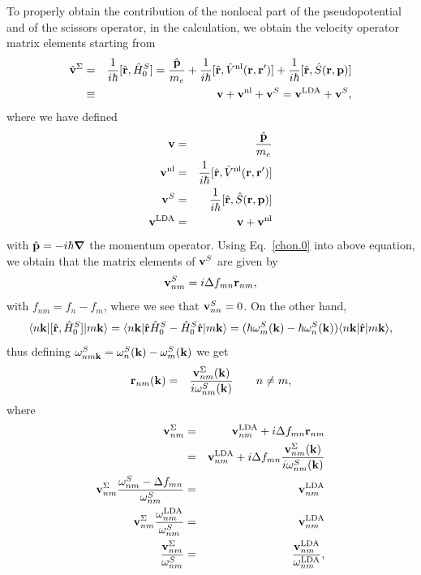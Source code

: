 \documentclass[floatfix,prb,aps,superscriptaddress,11pt,preprint]{revtex4}
\begin{document}
To properly obtain the contribution of the nonlocal part of the
pseudopotential and of the scissors operator, 
in the calculation, we obtain
the velocity operator matrix elements starting from
\begin{eqnarray}\label{vop}
\hat{\mathbf{v}}^\Sigma&=&
\frac{1}{i\hbar}[\hat{\mathbf{r}},\hat{H}^S_0]
=\frac{\hat{\mathbf{p}}}{m_e}
+
\frac{1}{i\hbar}[\hat{\mathbf{r}},\hat V^{\mathrm{nl}}(\mathbf{r},\mathbf{r}')]
+
\frac{1}{i\hbar}[\hat{\mathbf{r}},\hat S(\mathbf{r},\mathbf{p})]
\nonumber\\
&\equiv&
\mathbf{v}
+
\mathbf{v}^{\mathrm{nl}}
+\mathbf{v}^S
=
\mathbf{v}^{\mathrm{LDA}}
+\mathbf{v}^S
,
\end{eqnarray}
where we have defined
\begin{eqnarray}\label{conhr}
\mathbf{v}
&=&\frac{\hat{\mathbf{p}}}{m_e}
\nonumber\\
\mathbf{v}^{\mathrm{nl}}
&=&
\frac{1}{i\hbar}[\hat{\mathbf{r}},\hat V^{\mathrm{nl}}(\mathbf{r},\mathbf{r}')]
\nonumber\\
\mathbf{v}^S
&=&
\frac{1}{i\hbar}[\hat{\mathbf{r}},\hat S(\mathbf{r},\mathbf{p})]
\nonumber\\
\mathbf{v}^{\mathrm{LDA}}
&=&
\mathbf{v}
+\mathbf{v}^{\mathrm{nl}}
\end{eqnarray}  
with $\hat{\mathbf{p}}=-i\hbar\boldsymbol{\nabla}$ the momentum operator.
Using Eq.~\eqref{chon.0} into above equation, we obtain that the
matrix elements of $\mathbf{v}^S$ are given by
\begin{equation}\label{chon.2} 
\mathbf{v}^S_{nm}=i\Delta f_{mn}\mathbf{r}_{nm},
\end{equation}
with $f_{nm}=f_n-f_m$,
where we see that $\mathbf{v}^S_{nn}=0$.
On the other hand,
\begin{equation}\label{conhrnm}
\langle n\mathbf{k} |
[\hat{\mathbf{r}},\hat{H}^S_0]
| m\mathbf{k} \rangle=\langle n\mathbf{k} |\hat{\mathbf{r}}\hat{H}^S_0-\hat{H}^S_0\hat{\mathbf{r}}| m\mathbf{k} \rangle
=(\hbar\omega^S_m(\mathbf{k})-\hbar\omega^S_n(\mathbf{k}))\langle n\mathbf{k} |\hat{\mathbf{r}}| m\mathbf{k} \rangle
,
\end{equation}
thus defining $\omega^S_{nm\mathbf{k}}=\omega^S_n(\mathbf{k})-\omega^S_m(\mathbf{k})$ we get
\begin{eqnarray}\label{pmnrmn}
\mathbf{r}_{nm}(\mathbf{k})
&=&
\frac{\mathbf{v}^\Sigma_{nm}(\mathbf{k})}{i\omega^S_{nm}(\mathbf{k})}
\quad\quad n\ne m
,
\end{eqnarray} 
where
\begin{eqnarray}\label{chon.8}
\mathbf{v}^\Sigma_{nm}
&=&
\mathbf{v}^{\mathrm{LDA}}_{nm}+i\Delta f_{mn}\mathbf{r}_{nm}
\nonumber\\
&=&
\mathbf{v}^{\mathrm{LDA}}_{nm}+i\Delta f_{mn}\frac{\mathbf{v}^\Sigma_{nm}(\mathbf{k})}{i\omega^S_{nm}(\mathbf{k})}
\nonumber\\
\mathbf{v}^\Sigma_{nm}
\frac{\omega^S_{nm}-\Delta f_{mn}}{\omega^S_{nm}}
&=&
\mathbf{v}^{\mathrm{LDA}}_{nm}
\nonumber\\
\mathbf{v}^\Sigma_{nm}
\frac{\omega^{\mathrm{LDA}}_{nm}}{\omega^S_{nm}}
&=&
\mathbf{v}^{\mathrm{LDA}}_{nm}
\nonumber\\
\frac{\mathbf{v}^\Sigma_{nm}}{\omega^S_{nm}}
&=&
\frac{\mathbf{v}^{\mathrm{LDA}}_{nm}}{\omega^{\mathrm{LDA}}_{nm}}
,
\end{eqnarray}
\end{document}
